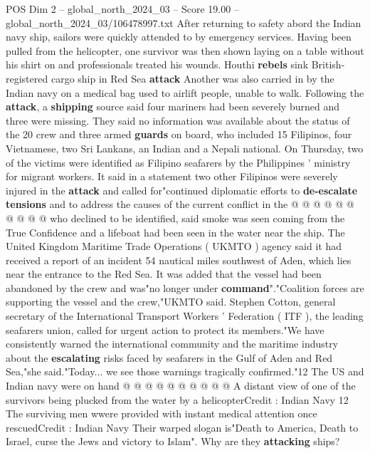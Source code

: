 \begin{textsample}{POS Dim 2 – global\_north\_2024\_03 – Score 19.00 – global\_north\_2024\_03/106478997.txt}  \label{ex:f2_pos_364}
After returning to safety abord the Indian navy ship, sailors were quickly attended to by emergency services.
Having been pulled from the helicopter, one survivor was then shown laying on a table without his shirt on and professionals treated his wounds.
Houthi \textbf{rebels} sink British-registered cargo ship in Red Sea \textbf{attack} Another was also carried in by the Indian navy on a medical bag used to airlift people, unable to walk.
Following the \textbf{attack}, a \textbf{shipping} source said four mariners had been severely burned and three were missing.
They said no information was available about the status of the 20 crew and three armed \textbf{guards} on board, who included 15 Filipinos, four Vietnamese, two Sri Lankans, an Indian and a Nepali national.
On Thursday, two of the victims were identified as Filipino seafarers by the Philippines ' ministry for migrant workers.
It said in a statement two other Filipinos were severely injured in the \textbf{attack} and called for"continued diplomatic efforts to \textbf{de-escalate} \textbf{tensions} and to address the causes of the current conflict in the @ @ @ @ @ @ @ @ @ @ who declined to be identified, said smoke was seen coming from the True Confidence and a lifeboat had been seen in the water near the ship.
The United Kingdom Maritime Trade Operations ( UKMTO ) agency said it had received a report of an incident 54 nautical miles southwest of Aden, which lies near the entrance to the Red Sea.
It was added that the vessel had been abandoned by the crew and was"no longer under \textbf{command}"."Coalition forces are supporting the vessel and the crew,"UKMTO said.
Stephen Cotton, general secretary of the International Transport Workers ' Federation ( ITF ), the leading seafarers union, called for urgent action to protect its members."We have consistently warned the international community and the maritime industry about the \textbf{escalating} risks faced by seafarers in the Gulf of Aden and Red Sea,"she said."Today... we see those warnings tragically confirmed."12 The US and Indian navy were on hand @ @ @ @ @ @ @ @ @ @ A distant view of one of the survivors being plucked from the water by a helicopterCredit : Indian Navy 12 The surviving men wwere provided with instant medical attention once rescuedCredit : Indian Navy Their warped slogan is"Death to America, Death to Israel, curse the Jews and victory to Islam".
Why are they \textbf{attacking} ships?

\end{textsample}
